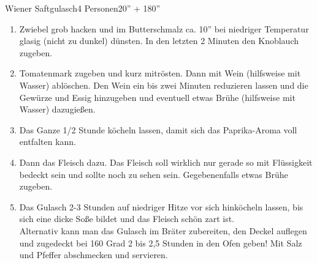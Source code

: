 \begin{MyRecipe}{Wiener Saftgulasch}{4 Personen}{20'' + 180''}
	
		
		
		

\begin{enumerate}
	\item Zwiebel grob hacken und im Butterschmalz ca. 10'' bei niedriger Temperatur glasig (nicht zu dunkel) dünsten. In den letzten 2 Minuten den Knoblauch zugeben.

	\item Tomatenmark zugeben und kurz mitrösten. Dann mit Wein (hilfsweise mit Wasser) ablöschen. Den Wein ein bis zwei Minuten reduzieren lassen und die Gewürze und Essig hinzugeben und eventuell etwas Brühe (hilfsweise mit Wasser) dazugießen.
	\item Das Ganze 1/2 Stunde köcheln lassen, damit sich das Paprika-Aroma voll entfalten kann.
	\item Dann das Fleisch dazu. Das Fleisch soll wirklich nur gerade so mit Flüssigkeit bedeckt sein und sollte noch zu sehen sein. Gegebenenfalls etwas Brühe zugeben.
	\item Das Gulasch 2-3 Stunden auf niedriger Hitze vor sich hinköcheln lassen, bis sich eine dicke Soße bildet und das Fleisch schön zart ist.\\

	Alternativ kann man das Gulasch im Bräter zubereiten, den Deckel auflegen und zugedeckt bei 160 Grad 2 bis 2,5 Stunden in den Ofen geben! Mit Salz und Pfeffer abschmecken und servieren. 
\end{enumerate}

		
	\end{MyRecipe}